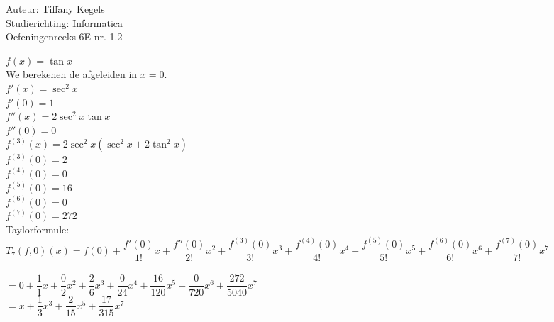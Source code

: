 \documentclass[a4paper]{article}
\begin{document}
  
\noindent \large Auteur: Tiffany Kegels \\
\noindent \large Studierichting: Informatica\\
\noindent \large Oefeningenreeks 6E nr. 1.2\\

\medskip

\normalsize

$f(x)=\tan x$\\

We berekenen de afgeleiden in $x=0$.\\

$f'(x)=\sec^2x$\\

$f'(0)=1$\\

$f''(x)=2\sec^2x\tan x$\\

$f''(0)=0$\\

$f^{(3)}(x)=2\sec^2x(\sec^2x+2\tan^2x)$\\

$f^{(3)}(0)=2$\\

$f^{(4)}(0)=0$\\

$f^{(5)}(0)=16$\\

$f^{(6)}(0)=0$\\

$f^{(7)}(0)=272$\\

Taylorformule:\\

$T_7(f,0)(x)=f(0)+\dfrac{f'(0)}{1!}x+\dfrac{f''(0)}{2!}x^2+\dfrac{f^{(3)}(0)}{3!}x^3+\dfrac{f^{(4)}(0)}{4!}x^4+\dfrac{f^{(5)}(0)}{5!}x^5+\dfrac{f^{(6)}(0)}{6!}x^6+\dfrac{f^{(7)}(0)}{7!}x^7$\\\\

$=0+\dfrac11x+\dfrac02x^2+\dfrac26x^3+\dfrac0{24}x^4+\dfrac{16}{120}x^5+\dfrac0{720}x^6+\dfrac{272}{5040}x^7$\\

$=x+\dfrac13x^3+\dfrac2{15}x^5+\dfrac{17}{315}x^7$


\begin{thebibliography}{999}

\end{thebibliography}
\end{document}
